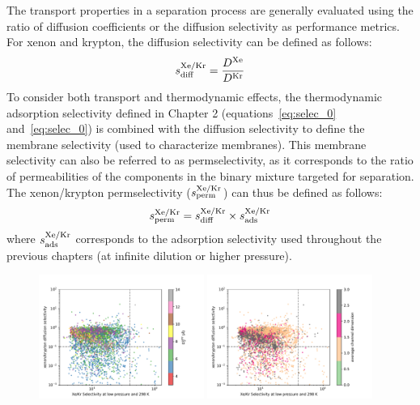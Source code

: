 \documentclass[main]{subfiles}
\begin{document}
The transport properties in a separation process are generally evaluated using the ratio of diffusion coefficients or the diffusion selectivity as performance metrics. For xenon and krypton, the diffusion selectivity can be defined as follows:\autocite{Krishna_2010}
\begin{equation}
  s^{\text{Xe/Kr}}_{\text{diff}} = \frac{D^{\text{Xe}}}{D^{\text{Kr}}}
\end{equation}
To consider both transport and thermodynamic effects, the thermodynamic adsorption selectivity defined in Chapter 2 (equations~\ref{eq:selec_0} and~\ref{eq:selec_0}) is combined with the diffusion selectivity to define the membrane selectivity (used to characterize membranes). This membrane selectivity can also be referred to as permselectivity, as it corresponds to the ratio of permeabilities of the components in the binary mixture targeted for separation. The xenon/krypton permselectivity ($s^{\text{Xe/Kr}}_{\text{perm}}$) can thus be defined as follows:
\begin{equation}\label{eq:membrane_selec}
  s^{\text{Xe/Kr}}_{\text{perm}} = s^{\text{Xe/Kr}}_{\text{diff}} \times s^{\text{Xe/Kr}}_{\text{ads}}
\end{equation}
where $s^{\text{Xe/Kr}}_{\text{ads}}$ corresponds to the adsorption selectivity used throughout the previous chapters (at infinite dilution or higher pressure). 

\begin{figure}[ht]
  \centering
    \includegraphics[width=0.48\textwidth]{figures/5-diffusion/diff_D_xekr-s0-lcd.pdf}
    \includegraphics[width=0.48\textwidth]{figures/5-diffusion/diff_D_xekr-s0-chandim.pdf}
    \caption{}\label{fgr:perm_selec0}
\end{figure}
\end{document}
